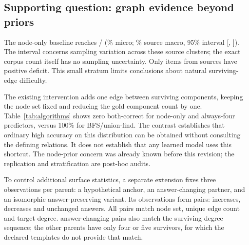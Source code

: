 \documentclass[10pt,twocolumn,letterpaper]{article}
\begin{document}
\subsection{Supporting question: graph evidence beyond priors}
\begin{table}[t]
\centering\small
\caption{Structural family reporting on the natural distribution.
``--'' means learned-model inference is unrun. Deletion requires the
algorithmic controls in Table~\ref{tab:algorithms} and paired success;
an ordinary family score alone is insufficient.}
\label{tab:structural}

\end{table}
\begin{table}[t]
\centering\small
\caption{Measured algorithmic controls on the unchanged \EvGraphN{}
deletion questions and their original/intervened pairs
(\EvSources{} sources). Both is the source-macro rate of answering
each pair correctly. Natural source-macro intervals are 95\%
source-cluster intervals, reported in the text and supplement.
These are executable baselines, not learned-model results.}
\label{tab:algorithms}

\end{table}

The node-only baseline reaches \EvNodeHits/\EvGraphN{}
(\EvNodeMicro\% micro; \EvNodeMacro\% source macro,
95\% interval [\EvNodeLo, \EvNodeHi]).
The interval concerns sampling variation across these source clusters;
the exact corpus count itself has no sampling uncertainty.
Only \EvPositiveDeficit{} items from \EvPositiveSources{} sources
have positive deficit. This small stratum limits conclusions about
natural surviving-edge difficulty.

The existing intervention adds one edge between surviving components,
keeping the node set fixed and reducing the gold component count by
one. Table~\ref{tab:algorithms} shows zero both-correct for node-only
and always-four predictors, versus 100\% for BFS/union-find. The
contrast establishes that ordinary high accuracy on this distribution
can be obtained without consulting the defining relations.
It does not establish that any learned model uses this shortcut.
The node-prior concern was already known before this revision;
the replication and stratification are post-hoc audits.

To control additional surface statistics, a separate extension fixes
three observations per parent: a hypothetical anchor, an
answer-changing partner, and an isomorphic answer-preserving variant.
Its \EvChallengeObs{} observations form \EvChallengePairs{} pairs:
\EvChallengeUp{} increases, \EvChallengeDown{} decreases and
\EvChallengeSame{} unchanged answers. All pairs match node set,
unique edge count and target degree. \EvDegreeMatched{} answer-changing pairs
also match the surviving degree sequence; the other \EvDegreeGaps{} parents have
only four or five survivors, for which the declared templates do not
provide that match.
\end{document}
